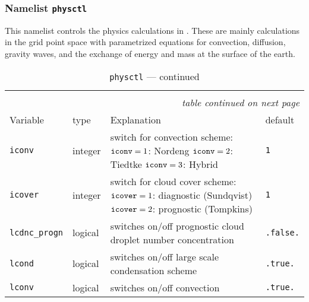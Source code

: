 \subsubsection{Namelist {\tt physctl}}

This namelist controls the physics calculations in \echam. These are
mainly calculations in the grid point space with parametrized
equations for convection, diffusion, gravity waves, and the exchange
of energy and mass at the surface of the earth.

\setlength{\LTcapwidth}{\textwidth}
\setlength{\LTleft}{0pt}\setlength{\LTright}{0pt}

\begin{longtable}{l@{\extracolsep\fill}lp{7cm}p{3.5cm}}\hline\hline
\caption[Namelist {\tt physctl}]{Namelist
  {\tt physctl}}\\\hline\label{tabphysctl}
\endfirsthead
\caption[]{{\tt physctl} --- continued}\\\hline
\endhead
\hline\multicolumn{4}{r}{\slshape table continued on next page}\\
\endfoot
\hline %
\endlastfoot
Variable & type & Explanation & default \\\hline
{\tt iconv}\index{namelist variables!iconv}
 &   integer  &   switch for convection scheme:\newline
                         ${\tt iconv}=1$: Nordeng\newline
                         ${\tt iconv}=2$: Tiedtke\newline
                         ${\tt iconv}=3$: Hybrid                 &
                         {\tt 1} \\
{\tt icover}\index{namelist variables!icover}
 &   integer   & switch for cloud cover scheme:\newline
                         ${\tt icover}=1$: diagnostic (Sundqvist)
                         \newline
                         ${\tt icover}=2$: prognostic (Tompkins) &
                         {\tt 1} \\
{\tt lcdnc\_progn}\index{namelist variables!lcdnc\_progn}
 & logical & switches on/off prognostic cloud
  droplet number concentration & {\tt .false.} \\
{\tt lcond}\index{namelist variables!lcond}
 &   logical  &   switches on/off large scale condensation scheme &
{\tt .true.} \\    
{\tt lconv}\index{namelist variables!lconv}
 &   logical  &   switches on/off convection & {\tt .true.}\\

\end{longtable}

